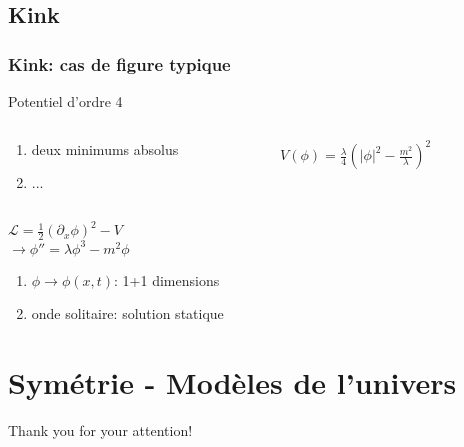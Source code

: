 \documentclass[handout]{beamer}
\begin{document}
\subsection{Kink}
\begin{frame}
\frametitle{Kink: cas de figure typique}
\begin{block}{Potentiel d'ordre 4}

 \begin{columns}
    \begin{column}{.5\linewidth}
    \begin{enumerate}
    \item deux minimums absolus
    \item ...
	\end{enumerate}      
    \end{column}
    \begin{column}{.5\linewidth}
    $V(\phi) = \frac{\lambda}{4}(|\phi|^2 -\frac{m^2}{\lambda})^2$
    \begin{figure}
    \end{figure}
    \end{column}
  \end{columns}

\end{block}
$\mathcal{L} = \frac{1}{2}(\partial_x \phi)^2 - V $ \\
$\rightarrow \phi'' = \lambda \phi^3 - m^2 \phi$ \\
\end{frame}


\begin{frame}

\end{frame}


\begin{frame}
\begin{enumerate}
\item $\phi \rightarrow \phi(x,t)$: 1+1 dimensions
\item onde solitaire: solution statique
\end{enumerate}
\end{frame}


\section{Symétrie - Modèles de l'univers }
\begin{frame}
Thank you for your attention!
\end{frame}
\end{document}
